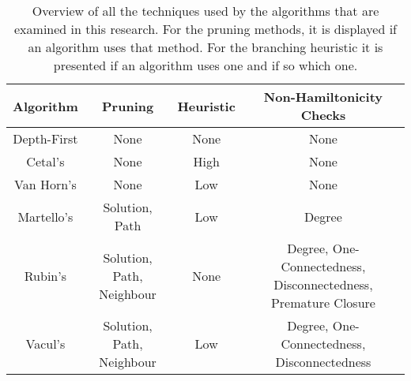 \begin{table*}[hb]
\small
     \centering
 \begin{tabular}{|c|c|c|c|}
 \hline
     \rowcolor{tableyellow}\textbf{Algorithm} & \textbf{Pruning} & \textbf{Heuristic} & \textbf{Non-Hamiltonicity} \textbf{Checks}\\
     \hline
     \hline
      \rowcolor{tablegray}Depth-First & None & None & None \\
      \rowcolor{tablegray}Cetal's & None & High & None        \\
      \rowcolor{tablegray}Van Horn's & None & Low & None            \\
      \rowcolor{tablegray}Martello's & Solution, Path & Low & Degree          \\
      \rowcolor{tablegray}Rubin's & Solution, Path, Neighbour & None   & Degree, One-Connectedness, Disconnectedness, Premature Closure          \\
      \rowcolor{tablegray}Vacul's & Solution, Path, Neighbour & Low & Degree, One-Connectedness, Disconnectedness \\
 \hline
 \end{tabular}
 
 \caption{Overview of all the techniques used by the algorithms that are examined in this research. For the pruning methods, it is displayed if an algorithm uses that method. For the branching heuristic it is presented if an algorithm uses one and if so which one.}
 \label{table:techniques}
\end{table*}
